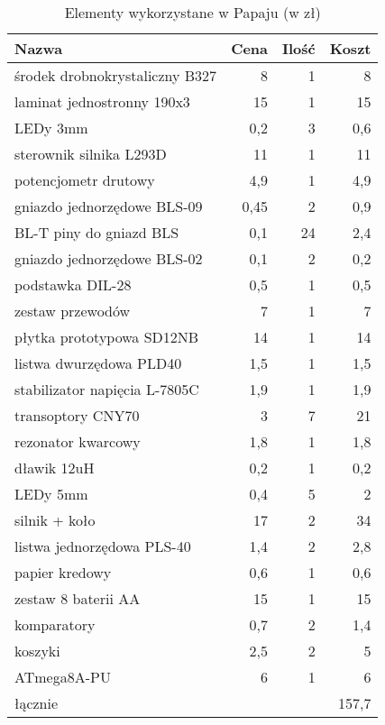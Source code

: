 \begin{table}[!htbp]
\centering
\caption{Elementy wykorzystane w Papaju (w zł)}
\label{table:koszta}
\begin{tabular}{l|r|r|r}
Nazwa                          & Cena & Ilość & Koszt \\
\hline
środek drobnokrystaliczny B327 & 8    & 1     & 8     \\
laminat jednostronny 190x3     & 15   & 1     & 15    \\
LEDy 3mm                       & 0,2  & 3     & 0,6   \\
sterownik silnika L293D        & 11   & 1     & 11    \\
potencjometr drutowy           & 4,9  & 1     & 4,9   \\
gniazdo jednorzędowe BLS-09    & 0,45 & 2     & 0,9   \\
BL-T piny do gniazd BLS        & 0,1  & 24    & 2,4   \\
gniazdo jednorzędowe BLS-02    & 0,1  & 2     & 0,2   \\
podstawka DIL-28               & 0,5  & 1     & 0,5   \\
zestaw przewodów               & 7    & 1     & 7     \\
płytka prototypowa SD12NB      & 14   & 1     & 14    \\
listwa dwurzędowa PLD40        & 1,5  & 1     & 1,5   \\
stabilizator napięcia L-7805C  & 1,9  & 1     & 1,9   \\
transoptory CNY70              & 3    & 7     & 21    \\
rezonator kwarcowy             & 1,8  & 1     & 1,8   \\
dławik 12uH                    & 0,2  & 1     & 0,2   \\
LEDy 5mm                       & 0,4  & 5     & 2     \\
silnik + koło                  & 17   & 2     & 34    \\
listwa jednorzędowa PLS-40     & 1,4  & 2     & 2,8   \\
papier kredowy                 & 0,6  & 1     & 0,6   \\
zestaw 8 baterii AA            & 15   & 1     & 15    \\
komparatory                    & 0,7  & 2     & 1,4   \\
koszyki                        & 2,5  & 2     & 5     \\
ATmega8A-PU                    & 6    & 1     & 6     \\
\hline
łącznie                          &      &       & 157,7
\end{tabular}


\end{table}
